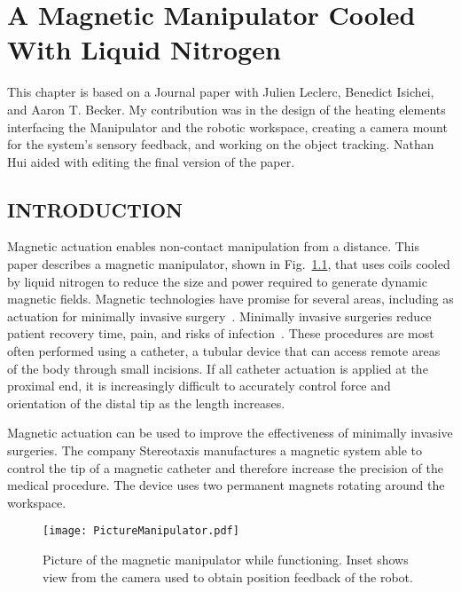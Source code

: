 



\chapter[A Magnetic Manipulator Cooled With Liquid Nitrogen]{A Magnetic Manipulator Cooled With Liquid Nitrogen}\label{chap-cryoMagnet}

This chapter is based on a Journal paper with Julien Leclerc, Benedict Isichei, and Aaron T. Becker.  My contribution was in the design of the heating elements interfacing the Manipulator and the robotic workspace, creating a camera mount for the system's sensory feedback, and working on the object tracking. 
Nathan Hui aided with editing the final version of the paper.


\section{INTRODUCTION}
Magnetic actuation enables non-contact manipulation from a distance.  
This paper describes a magnetic manipulator, shown in Fig.~\ref{MagneticManipulatorPic}, that uses coils cooled by liquid nitrogen to reduce the size and power required to generate dynamic magnetic fields. 
Magnetic technologies have promise for several areas, including as actuation for minimally invasive surgery~\cite{Stereoaxis,nelson2010microrobots}.
Minimally invasive surgeries reduce patient recovery time, pain, and risks of infection~\cite{robinson2004minimally}. 
 These procedures are most often performed using a catheter, a tubular device that can access remote areas of the body through small incisions. 
  If all catheter actuation is applied at the proximal end, it is increasingly difficult to accurately control force and orientation of the distal tip as the length increases. 

 Magnetic actuation can be used to improve the effectiveness of minimally invasive surgeries. 
 The company Stereotaxis \cite{Stereoaxis} manufactures a magnetic system able to control the tip of a magnetic catheter and therefore increase the precision of the medical procedure. 
 The device uses two permanent magnets rotating around the workspace.
 \begin{figure}
	\texttt{[image: PictureManipulator.pdf]}
	\caption{Picture of the magnetic manipulator while functioning. Inset shows view from the camera used to obtain position feedback of the robot.}
	\label{MagneticManipulatorPic}
\end{figure} 
 
